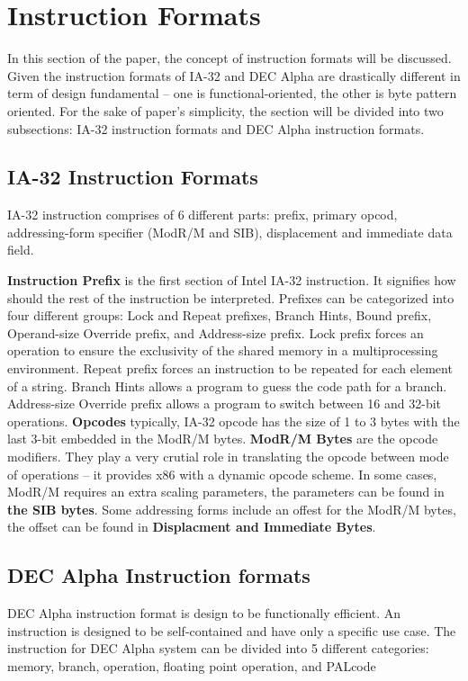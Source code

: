 \documentclass[letterpaper,10pt,titlepage]{article}
\begin{document}
\section{Instruction Formats}
In this section of the paper, the concept of instruction formats  will be
discussed. Given the instruction formats of IA-32 and DEC Alpha are drastically 
different in term of design fundamental -- one is functional-oriented, the other is
byte pattern oriented. For the sake of paper's simplicity, the section will be divided 
into two subsections: IA-32 instruction formats and DEC Alpha instruction formats. 

\subsection{IA-32 Instruction Formats}
IA-32 instruction comprises of 6 different parts: prefix, primary opcod, addressing-form
specifier (ModR/M and SIB), displacement and immediate data field. 


\textbf{Instruction Prefix} is the first section of Intel IA-32 instruction. 
It signifies how should the rest of the instruction be interpreted. Prefixes can be 
categorized into four different groups: Lock and Repeat prefixes, Branch Hints, Bound
prefix, Operand-size Override prefix, and Address-size prefix. Lock prefix 
forces an operation to ensure the exclusivity of the shared memory in a multiprocessing 
environment. Repeat prefix forces an instruction to be repeated for each element
of a string. Branch Hints allows a program to guess the code path for a branch.
Address-size Override prefix allows a program to switch between 16 and 32-bit 
operations. \textbf{Opcodes} typically, IA-32 opcode has the size of 1 to 3 bytes with
the last 3-bit embedded in the ModR/M bytes. \textbf{ModR/M Bytes} are the 
opcode modifiers. They play a very crutial role in translating the opcode between mode
of operations -- it provides x86 with a dynamic opcode scheme. In some cases, ModR/M
requires an extra scaling parameters, the parameters can be found in \textbf{the SIB 
bytes}. Some addressing forms include an offest for the ModR/M bytes, the offset can be 
found in \textbf{Displacment and Immediate Bytes}. 


\subsection{DEC Alpha Instruction formats}
DEC Alpha instruction format is design to be functionally efficient. 
An instruction is designed to be self-contained and have only a specific use case.
The instruction for DEC Alpha system can be divided into 5 different categories:
memory, branch, operation, floating point operation, and PALcode
\end{document}
